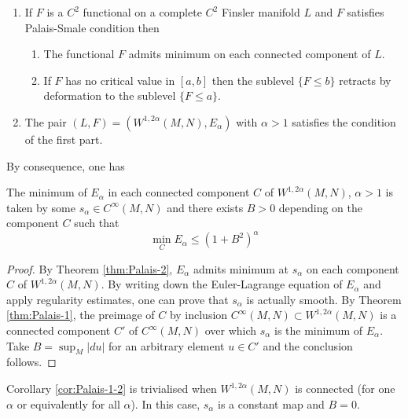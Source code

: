 \begin{theorem}
\label{thm:Palais-2}
\begin{enumerate}
\item If \(F\) is a \(C^2\) functional on a complete \(C^2\) Finsler manifold \(L\)
and \(F\) satisfies Palais-Smale condition then
\begin{enumerate}
\item The functional \(F\) admits minimum on each connected component of \(L\).
\item If \(F\) has no critical value in \([a,b]\) then the sublevel \(\{F\leq b\}\)
retracts by deformation to the sublevel \(\{F\leq a\}\).
\end{enumerate}
\item The pair \((L,F)=(W^{1,2\alpha}(M,N), E_\alpha)\) with \(\alpha > 1\) satisfies the
condition of the first part.
\end{enumerate}
\end{theorem}

By consequence, one has

\begin{corollary}
\label{cor:Palais-1-2}
The minimum of \(E_\alpha\) in each connected component \(C\) of \(W^{1,2\alpha}(M,N)\), \(\alpha >1\) is taken by some \(s_\alpha \in C^\infty(M,N)\) and there exists \(B>0\)
depending on the component \(C\) such that 
\[
 \min_{C}E_\alpha \leq (1+B^2)^\alpha
\]
\end{corollary}

\begin{proof}
By Theorem \ref{thm:Palais-2}, \(E_\alpha\) admits minimum at \(s_\alpha\) on each
component \(C\) of \(W^{1,2\alpha}(M,N)\). By writing down the Euler-Lagrange equation
of \(E_\alpha\) and apply regularity estimates, one can prove that \(s_\alpha\) is
actually smooth. By Theorem \ref{thm:Palais-1}, the preimage of \(C\) by inclusion \(C^\infty(M,N)\subset W^{1,2\alpha}(M,N)\) is a connected component \(C'\) of \(C^\infty(M,N)\) over which \(s_\alpha\)
is the minimum of \(E_\alpha\). Take \(B = \sup_M |du|\) for an arbitrary element \(u\in C'\) and the conclusion follows.
\end{proof}

\begin{remark}
Corollary \ref{cor:Palais-1-2} is trivialised when \(W^{1,2\alpha}(M,N)\) is connected
(for one \(\alpha\) or equivalently for all \(\alpha\)). In
this case, \(s_\alpha\) is a constant map and \(B=0\).
\end{remark}

